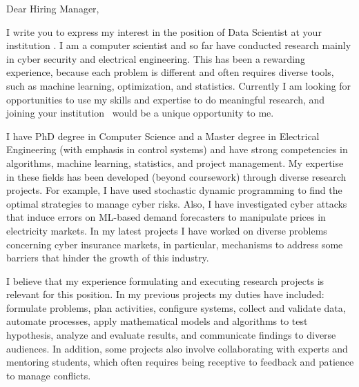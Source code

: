 \documentclass[letter,10pt]{letter}
\newcommand{\position}{Data Scientist  }
\newcommand{\place}{your institution }
\begin{document}
\begin{letter}{
}
 
\opening{Dear Hiring Manager,}

I write you to express my interest in the position of \position  at \place.
I am a computer scientist and so far have conducted research mainly in cyber security and electrical engineering. This has been a rewarding experience, because each problem is different and often requires diverse tools, such as machine learning, optimization, and statistics. 
Currently I am looking for opportunities to use my skills and expertise to do meaningful research, and joining \place \ would be a unique opportunity to me.






I have PhD degree in Computer Science 
and a Master degree in Electrical Engineering (with emphasis in control systems) 
and have strong competencies in algorithms, machine learning, statistics, and project management. My expertise in these fields has been developed (beyond coursework) through diverse research projects. 
For example, I have used stochastic dynamic programming to find the optimal strategies to manage cyber risks. 
Also, I have investigated cyber attacks that induce errors on ML-based demand forecasters to manipulate prices in electricity markets. 
In my latest projects I have worked on diverse problems concerning cyber insurance markets, in particular, mechanisms to address
some barriers that hinder the growth of this industry. 

I believe that my experience formulating and executing research projects is relevant for this position. In my previous projects my duties have included: formulate problems, plan activities, configure systems, collect and validate data, automate processes, apply mathematical models and algorithms to test hypothesis, analyze and evaluate results,  and communicate findings to diverse audiences. In addition, some projects also involve collaborating with experts and mentoring students, which often requires being receptive to feedback and patience to manage conflicts.



\end{letter}
\end{document}
